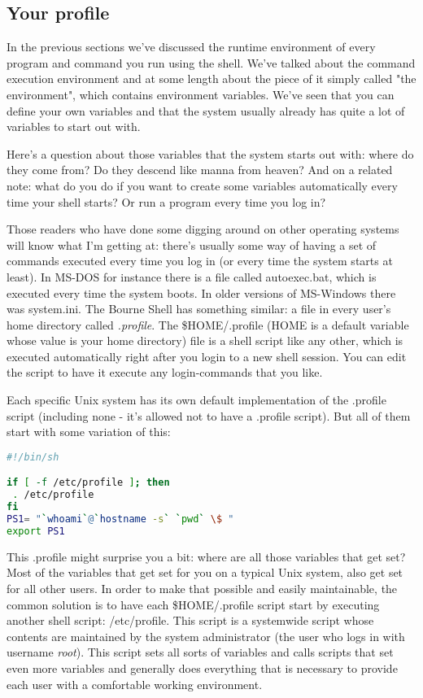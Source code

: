 \subsection{Your profile} In the previous sections we've discussed the
runtime environment of every program and command you run using the shell. We've
talked about the command execution environment and at some length about the
piece of it simply called "the environment", which contains environment
variables. We've seen that you can define your own variables and that the
system usually already has quite a lot of variables to start out with.

Here's a question about those variables that the system starts out with: where
do they come from? Do they descend like manna from heaven? And on a related
note: what do you do if you want to create some variables automatically every
time your shell starts? Or run a program every time you log in?

Those readers who have done some digging around on other operating systems will
know what I'm getting at: there's usually some way of having a set of commands
executed every time you log in (or every time the system starts at least). In
MS-DOS for instance there is a file called autoexec.bat, which is executed
every time the system boots. In older versions of MS-Windows there was
system.ini. The Bourne Shell has something similar: a file in every user's home
directory called \textit{.profile}. The \$HOME/.profile (HOME is a default
variable whose value is your home directory) file is a shell script like any
other, which is executed automatically right after you login to a new shell
session. You can edit the script to have it execute any login-commands that you
like.

Each specific Unix system has its own default implementation of the .profile
script (including none - it's allowed not to have a .profile script). But all
of them start with some variation of this:
\lstset{basicstyle=\scriptsize, numbers=left, captionpos=b, tabsize=4}
\begin{lstlisting}[caption=A basic (but typical) HOME profile,language={bash},
xleftmargin=15pt,label=lst:A basic (but typical) HOME profile]
#!/bin/sh

if [ -f /etc/profile ]; then
 . /etc/profile
fi
PS1= "`whoami`@`hostname -s` `pwd` \$ "
export PS1
\end{lstlisting}

This .profile might surprise you a bit: where are all those variables that get
set? Most of the variables that get set for you on a typical Unix system, also
get set for all other users. In order to make that possible and easily
maintainable, the common solution is to have each \$HOME/.profile script start
by executing another shell script: /etc/profile. This script is a
systemwide script whose contents are maintained by the system administrator
(the user who logs in with username \textit{root}). This script sets all sorts
of variables and calls scripts that set even more variables and generally does
everything that is necessary to provide each user with a comfortable working
environment.

